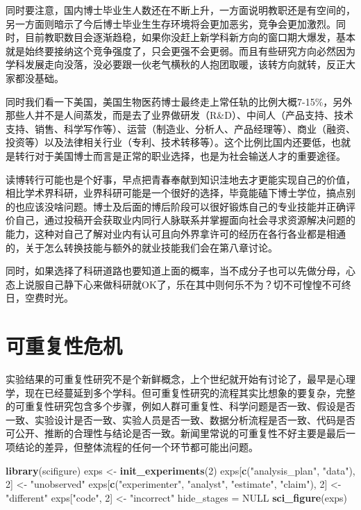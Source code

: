 \documentclass[]{tufte-book}
\newenvironment{Shaded}{}{}
\newcommand{\DecValTok}[1]{\textcolor[rgb]{0.25,0.63,0.44}{#1}}
\newcommand{\KeywordTok}[1]{\textcolor[rgb]{0.00,0.44,0.13}{\textbf{#1}}}
\newcommand{\NormalTok}[1]{#1}
\newcommand{\OtherTok}[1]{\textcolor[rgb]{0.00,0.44,0.13}{#1}}
\newcommand{\StringTok}[1]{\textcolor[rgb]{0.25,0.44,0.63}{#1}}
\begin{document}
同时要注意，国内博士毕业生人数还在不断上升，一方面说明教职还是有空间的，另一方面则暗示了今后博士毕业生生存环境将会更加恶劣，竞争会更加激烈。同时，目前教职数目会逐渐趋稳，如果你没赶上新学科新方向的窗口期大爆发，基本就是始终要接纳这个竞争强度了，只会更强不会更弱。而且有些研究方向必然因为学科发展走向没落，没必要跟一伙老气横秋的人抱团取暖，该转方向就转，反正大家都没基础。

同时我们看一下美国，美国生物医药博士最终走上常任轨的比例大概7-15\%，另外那些人并不是人间蒸发，而是去了业界做研发（R\&D）、中间人（产品支持、技术支持、销售、科学写作等）、运营（制造业、分析人、产品经理等）、商业（融资、投资等）以及法律相关行业（专利、技术转移等）。这个比例比国内还要低，也就是转行对于美国博士而言是正常的职业选择，也是为社会输送人才的重要途径。

读博转行可能也是个好事，早点把青春奉献到知识洼地去才更能实现自己的价值，相比学术界科研，业界科研可能是一个很好的选择，毕竟能磕下博士学位，搞点别的也应该没啥问题。博士及后面的博后阶段可以很好锻炼自己的专业技能并正确评价自己，通过投稿开会获取业内同行人脉联系并掌握面向社会寻求资源解决问题的能力，这种对自己了解对业内有认可且向外界拿许可的经历在各行各业都是相通的，关于怎么转换技能与额外的就业技能我们会在第八章讨论。

同时，如果选择了科研道路也要知道上面的概率，当不成分子也可以先做分母，心态上说服自己静下心来做科研就OK了，乐在其中则何乐不为？切不可惶惶不可终日，空费时光。

\hypertarget{ux53efux91cdux590dux6027ux5371ux673a}{%
\section{可重复性危机}\label{ux53efux91cdux590dux6027ux5371ux673a}}

实验结果的可重复性研究不是个新鲜概念，上个世纪就开始有讨论了，最早是心理学，现在已经蔓延到多个学科。但可重复性研究的流程其实比想象的要复杂，完整的可重复性研究包含多个步骤，例如人群可重复性、科学问题是否一致、假设是否一致、实验设计是否一致、实验人员是否一致、数据分析流程是否一致、代码是否可公开、推断的合理性与结论是否一致。新闻里常说的可重复性不好主要是最后一项结论的差异，但整体流程的任何一个环节都可能出问题。

\begin{Shaded}
\begin{Highlighting}[]
\KeywordTok{library}\NormalTok{(scifigure)}
\NormalTok{exps <-}\StringTok{ }\KeywordTok{init_experiments}\NormalTok{(}\DecValTok{2}\NormalTok{)}
\NormalTok{exps[}\KeywordTok{c}\NormalTok{(}\StringTok{"analysis_plan"}\NormalTok{, }\StringTok{"data"}\NormalTok{), }\DecValTok{2}\NormalTok{] <-}\StringTok{ "unobserved"}
\NormalTok{exps[}\KeywordTok{c}\NormalTok{(}\StringTok{"experimenter"}\NormalTok{, }\StringTok{"analyst"}\NormalTok{, }\StringTok{"estimate"}\NormalTok{, }\StringTok{"claim"}\NormalTok{), }\DecValTok{2}\NormalTok{] <-}\StringTok{ "different"}
\NormalTok{exps[}\StringTok{"code"}\NormalTok{, }\DecValTok{2}\NormalTok{] <-}\StringTok{ "incorrect"}
\NormalTok{hide_stages =}\StringTok{ }\OtherTok{NULL}
\KeywordTok{sci_figure}\NormalTok{(exps)}
\end{Highlighting}
\end{Shaded}
\end{document}

